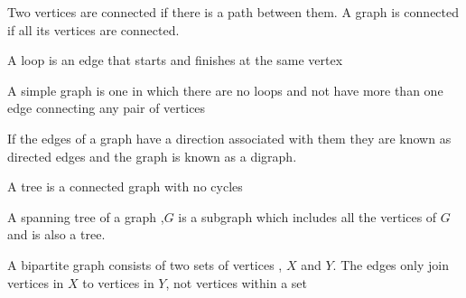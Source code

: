 \documentclass[a4paper]{article}
\begin{document}
\begin{defi}[Connected]
	Two vertices are connected if there is a path between them. A graph is connected if all its vertices are connected.
\end{defi}

\begin{defi}[Loop]
	A loop is an edge that starts and finishes at the same vertex
\end{defi}

\begin{defi}
	A simple graph is one in which there are no loops and not have more than one edge connecting any pair of vertices
\end{defi}

\begin{defi}[Digraph]
	If the edges of a graph have a direction associated with them they are known as directed edges and the graph is known as a digraph.
\end{defi}

\begin{defi}[Tree]
	A tree is a connected graph with no cycles
\end{defi}

\begin{defi}
	A spanning tree of a graph ,$G$ is a subgraph which includes all the vertices of $G$ and is also a tree.
\end{defi}

\begin{defi}
	A bipartite graph consists of two sets of vertices , $X$ and $Y$. The edges only join vertices in $X$ to vertices in $Y$, not vertices within a set
\end{defi}

\end{document}
